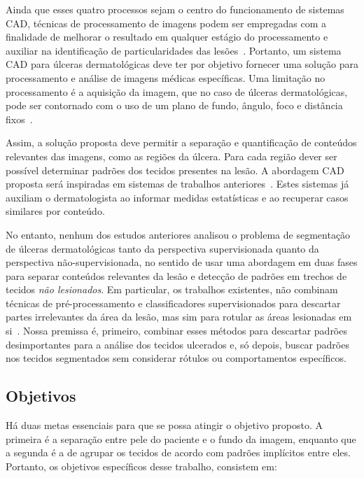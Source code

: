 Ainda que esses quatro processos sejam o centro do funcionamento de sistemas CAD, técnicas de processamento de imagens podem ser empregadas com a finalidade de melhorar o resultado em qualquer estágio do processamento e auxiliar na identificação de particularidades das lesões~\cite{Gonzalez2008}. 
Portanto, um sistema CAD para úlceras dermatológicas deve ter por objetivo fornecer uma solução para processamento e análise de imagens médicas específicas.
Uma limitação no processamento é a aquisição da imagem, que no caso de úlceras dermatológicas, pode ser contornado com o uso de um plano de fundo, ângulo, foco e distância fixos~\cite{Pereyra2014}.  

Assim, a solução proposta deve permitir a separação e quantificação de conteúdos relevantes das imagens, como as regiões da úlcera. 
Para cada região dever ser possível determinar padrões dos tecidos presentes na lesão. 
A abordagem CAD proposta será inspiradas em sistemas de trabalhos anteriores~\cite{Pereira2011,Blanco2016,Kavitha2017,Chino2018}.
Estes sistemas já auxiliam o dermatologista ao informar medidas estatísticas e ao recuperar casos similares por conteúdo. 

No entanto, nenhum dos estudos anteriores analisou o problema de segmentação de úlceras dermatológicas tanto da perspectiva supervisionada quanto da perspectiva não-supervisionada, no sentido de usar uma abordagem em duas fases para separar conteúdos relevantes da lesão e detecção de padrões em trechos de tecidos \textit{não lesionados}.
Em particular, os trabalhos existentes, não combinam técnicas de pré-processamento e classificadores supervisionados para descartar partes irrelevantes da área da lesão, mas sim para rotular as áreas lesionadas em si~\cite{Chino2018}.
Nossa premissa é, primeiro, combinar esses métodos para descartar padrões desimportantes para a análise dos tecidos ulcerados e, só depois, buscar padrões nos tecidos segmentados sem considerar rótulos ou comportamentos específicos.


\subsection{Objetivos}

Há duas metas essenciais para que se possa atingir o objetivo proposto. 
A primeira é a separação entre pele do paciente e o fundo da imagem, enquanto que a segunda é a de agrupar os tecidos de acordo com padrões implícitos entre eles.
Portanto, os objetivos específicos desse trabalho, consistem em:

